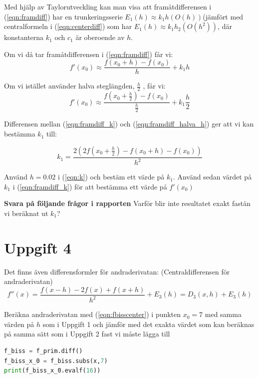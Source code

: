\documentclass[a4paper]{article}
\begin{document}
Med hjälp av Taylorutveckling kan man visa att framåtdifferensen i (\ref{eqn:framdiff}) har
en trunkeringsserie \( E_1(h)\approx k_1h(O(h)) \)(jämfört med centralformeln i (\ref{eqn:centerdiff})
som har \(E_1(h)\approx k_1h_2(O(h^2))\), där konstanterna \(k_1\)  och \(c_1\)  är oberoende av \(h\).

Om vi då tar framåtdifferensen i (\ref{eqn:framdiff}) får vi:
\begin{equation} \label{eqn:framdiff_k}
  f'(x_0)\approx \frac{f(x_0+h)-f(x_0)}{h}+k_1h
\end{equation}

Om vi istället använder halva steglängden, \( \frac{h}{2} \) , får vi:
\begin{equation} \label{eqn:framdiff_halva_h}
  f'(x_0)\approx \frac{f(x_0+\frac{h}{2})-f(x_0)}{\frac{h}{2}}+k_1 \frac{h}{2}
\end{equation}

Differensen mellan (\ref{eqn:framdiff_k}) och (\ref{eqn:framdiff_halva_h}) ger att vi kan bestämma \( k_1 \) till:

\begin{equation} \label{eqn:k}
  k_1=\frac{2\left(2f\left(x_0+\frac{h}{2}\right)-f\left(x_0+h\right)-f\left(x_0\right)\right)}{h^2}
\end{equation}

Använd \( h=0.02 \) i (\ref{eqn:k}) och bestäm ett värde på \( k_1 \). Använd sedan värdet på \( k_1 \) i (\ref{eqn:framdiff_k})
för att bestämma ett värde på \( f'(x_0) \)

\textbf{Svara på följande frågor i rapporten}
Varför blir inte resultatet exakt fastän vi beräknat ut \( k_1 \)?

\section{Uppgift 4}
Det finns även differensformler för andraderivatan: (Centraldifferensen för andraderivatan)
\begin{equation} \label{eqn:fbisscenter}
  f''(x)=\frac{f(x-h)-2f(x)+f(x+h)}{h^2}+E_3(h)=D_3(x,h)+E_3(h)
\end{equation}

Beräkna andraderivatan med (\ref{eqn:fbisscenter}) i punkten \( x_0=7 \)  med samma värden på
\( h  \)  som i Uppgift 1 och jämför med det exakta värdet som kan beräknas på samma sätt som
i Uppgift 2 fast vi måste lägga till

\begin{lstlisting}[language=Python]
f_biss = f_prim.diff()
f_biss_x_0 = f_biss.subs(x,7)
print(f_biss_x_0.evalf(16))
\end{lstlisting}
\end{document}
